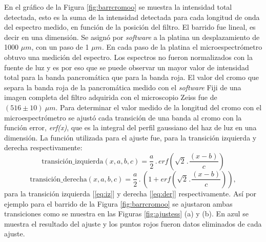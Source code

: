 En el gráfico de la Figura \ref{fig:barrcromoo} se muestra la intensidad total detectada, esto es la suma de la intensidad detectada para cada longitud de onda del espectro medido, en función de la posición del filtro. El barrido fue lineal, es decir en una dimensión. Se asignó por \textit{software} a la platina un desplazamiento de 1000 $\mu m$, con un paso de 1 $\mu m$. En cada paso de la platina el microespectrómetro obtuvo una medición del espectro. Los espectros no fueron normalizados con la fuente de luz y es por eso que se puede observar un mayor valor de intensidad total para la banda pancromática que para la banda roja. El valor del cromo que separa la banda roja de la pancromática medido con el \textit{software} Fiji de una imagen completa del filtro adquirida con el microscopio Zeiss fue de $( 516 \pm 10)~ \mu m$.
Para determinar el valor medido de la longitud del cromo con el microespectrómetro se ajustó cada transición de una banda al cromo con la función error, \textit{erf(x)}, que es la integral del perfil gaussiano del haz de luz en una dimensión. La función utilizada para el ajuste fue, para la transición izquierda y derecha respectivamente:
\begin{equation}
\text{transición\_izquierda} (x,a,b,c) = \frac{a}{2}\hspace{2pt}.\hspace{2pt}erf\left(\sqrt{2}\hspace{1pt}.\hspace{1pt}\frac{(x-b)}{c}\right)
\label{eq:iz}
\end{equation}
\begin{equation}
\text{transición\_derecha} (x,a,b,c) = \frac{a}{2}\hspace{2pt}.\hspace{2pt}\left(1+erf\left(\sqrt{2}\hspace{1pt}.\hspace{1pt}\frac{(x-b)}{c}\right)\right),
\label{eq:der}
 \end{equation} para la transición izquierda [\ref{eq:iz}] y derecha [\ref{eq:der}] respectivamente. Así por ejemplo para el barrido de la Figura \ref{fig:barrcromoo} se ajustaron ambas transiciones como se muestra en las Figuras \ref{fig:ajustess} (a) y (b). En azul se muestra el resultado del ajuste y los puntos rojos fueron datos eliminados de cada ajuste.
